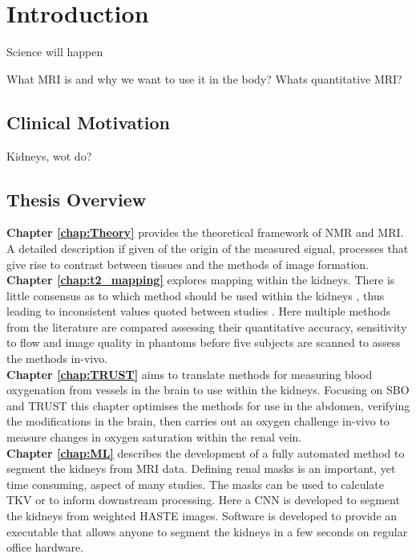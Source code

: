\chapter*{Introduction}
Science will happen

What MRI is and why we want to use it in the body? Whats quantitative MRI?

\section*{Clinical Motivation}
Kidneys, wot do? 

\section*{Thesis Overview}

\textbf{Chapter \ref{chap:Theory}} provides the theoretical framework of \ac{NMR} and \ac{MRI}. A detailed description if given of the origin of the measured signal, processes that give rise to contrast between tissues and the methods of image formation. \\

\textbf{Chapter \ref{chap:t2_mapping}} explores \ttwo mapping within the kidneys. There is little consensus as to which method should be used within the kidneys \cite{dekkers_consensus-based_2019}, thus leading to inconsistent values quoted between studies \cite{wolf_magnetic_2018}. Here multiple methods from the literature are compared assessing their quantitative accuracy, sensitivity to flow and image quality in phantoms before five subjects are scanned to assess the methods in-vivo.\\

\textbf{Chapter \ref{chap:TRUST}} aims to translate methods for measuring blood oxygenation from vessels in the brain to use within the kidneys. Focusing on \ac{SBO} \cite{jain_mri_2010} and \ac{TRUST} \cite{lu_quantitative_2008} this chapter optimises the methods for use in the abdomen, verifying the modifications in the brain, then carries out an oxygen challenge in-vivo to measure changes in oxygen saturation within the renal vein.\\

\textbf{Chapter \ref{chap:ML}} describes the development of a fully automated method to segment the kidneys from \ac{MRI} data. Defining renal masks is an important, yet time consuming, aspect of many studies. The masks can be used to calculate \ac{TKV} or to inform downstream processing. Here a \ac{CNN} is developed to segment the kidneys from \ttwo weighted \ac{HASTE} images. Software is developed to provide an executable that allows anyone to segment the kidneys in a few seconds on regular office hardware.\\

